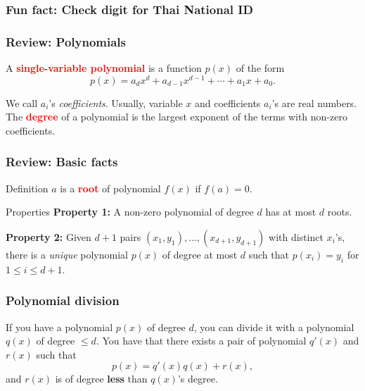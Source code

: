 

\begin{frame}
  \frametitle{Fun fact: Check digit for Thai National ID}
\end{frame}

\begin{frame}
  \frametitle{Review: Polynomials}

  A \textcolor{red}{\bf single-variable polynomial} is a function
  $p(x)$ of the form
  \[
  p(x) = a_dx^d+a_{d-1}x^{d-1}+\cdots+a_1x+a_0.
  \]

  We call $a_i$'s {\em coefficients}.  Usually, variable $x$ and
  coefficients $a_i$'s are real numbers.  The \textcolor{red}{\bf
    degree} of a polynomial is the largest exponent of the terms with
  non-zero coefficients.
  
\end{frame}

\begin{frame}
  \frametitle{Review: Basic facts}

  \begin{block}{Definition}
    $a$ is a \textcolor{red}{\bf root} of polynomial $f(x)$ if
    $f(a)=0$.
  \end{block}
  
  \begin{block}{Properties}
    {\bf Property 1:} A non-zero polynomial of degree $d$ has at most
    $d$ roots.

    {\bf Property 2:} Given $d+1$ pairs
    $(x_1,y_1),\ldots,(x_{d+1},y_{d+1})$ with distinct $x_i$'s, there
    is a {\em unique} polynomial $p(x)$ of degree at most $d$ such
    that $p(x_i)=y_i$ for $1\leq i\leq d+1$.
  \end{block}
\end{frame}

\begin{frame}
  \frametitle{Polynomial division}
  \pause

  \begin{tcolorbox}
    If you have a polynomial $p(x)$ of degree $d$, you can divide it
    with a polynomial $q(x)$ of degree $\leq d$.  You have that there
    exists a pair of polynomial $q'(x)$ and $r(x)$ such that
    \[
    p(x) = q'(x)q(x) + r(x),
    \]
    and $r(x)$ is of degree {\bf less} than $q(x)$'s degree.
  \end{tcolorbox}
\end{frame}

